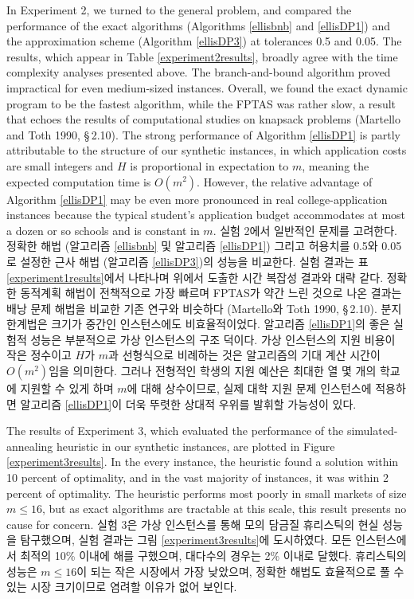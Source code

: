 \documentclass[11pt]{article} %
\theoremstyle{definition}
\theoremstyle{definition}
\begin{document}
\ifen
In Experiment 2, we turned to the general problem, and compared the performance of the exact algorithms (Algorithms \ref{ellisbnb} and \ref{ellisDP1}) and the approximation scheme (Algorithm \ref{ellisDP3}) at tolerances 0.5 and 0.05.  The results, which appear in Table \ref{experiment2results}, broadly agree with the time complexity analyses presented above. The branch-and-bound algorithm proved impractical for even medium-sized instances. Overall, we found the exact dynamic program to be the fastest algorithm, while the FPTAS was rather slow, a result that echoes the results of computational studies on knapsack problems (Martello and Toth 1990, \S\,2.10). The strong performance of Algorithm \ref{ellisDP1} is partly attributable to the structure of our synthetic instances, in which application costs are small integers and $H$ is proportional in expectation to $m$, meaning the expected computation time is $O(m^2)$. However, the relative advantage of Algorithm \ref{ellisDP1} may be even more pronounced in real college-application instances because the typical student's application budget accommodates at most a dozen or so schools and is constant in $m$. 
\else
실험 2에서 일반적인 문제를 고려한다. 정확한 해법 (알고리즘 \ref{ellisbnb} 및 알고리즘 \ref{ellisDP1}) 그리고 허용치를 0.5와 0.05로 설정한 근사 해법 (알고리즘 \ref{ellisDP3})의 성능을 비교한다. 실험 결과는 표 \ref{experiment1results}에서 나타나며 위에서 도출한 시간 복잡성 결과와 대략 같다. 정확한 동적계획 해법이 전책적으로 가장 빠르며 FPTAS가 약간 느린 것으로 나온 결과는 배낭 문제 해법을 비교한 기존 연구와 비슷하다 (Martello와 Toth 1990, \S\,2.10). 분지한계법은 크기가 중간인 인스턴스에도 비효율적이었다. 알고리즘 \ref{ellisDP1}의 좋은 실험적 성능은 부분적으로 가상 인스턴스의 구조 덕이다. 가상 인스턴스의 지원 비용이 작은 정수이고 $H$가 $m$과 선형식으로 비례하는 것은 알고리즘의 기대 계산 시간이 $O(m^2)$임을 의미한다. 그러나 전형적인 학생의 지원 예산은 최대한 열 몇 개의 학교에 지원할 수 있게 하며 $m$에 대해 상수이므로, 실제 대학 지원 문제 인스턴스에 적용하면 알고리즘 \ref{ellisDP1}이 더욱 뚜렷한 상대적 우위를 발휘할 가능성이 있다. 
\fi

\ifen
The results of Experiment 3, which evaluated the performance of the simulated-annealing heuristic in our synthetic instances, are plotted in Figure \ref{experiment3results}. In the every instance, the heuristic found a solution within 10 percent of optimality, and in the vast majority of instances, it was within 2 percent of optimality. The heuristic performs most poorly in small markets of size $m \leq 16$, but as exact algorithms are tractable at this scale, this result presents no cause for concern.
\else
실험 3은 가상 인스턴스를 통해 모의 담금질 휴리스틱의 현실 성능을 탐구했으며, 실험 결과는 그림 \ref{experiment3results}에 도시하였다. 모든 인스턴스에서 최적의 10\% 이내에 해를 구했으며, 대다수의 경우는 2\% 이내로 달했다. 휴리스틱의 성능은 $m \leq 16$이 되는 작은 시장에서 가장 낮았으며, 정확한 해법도 효율적으로 풀 수 있는 시장 크기이므로 염려할 이유가 없어 보인다.
\fi
\end{document}
